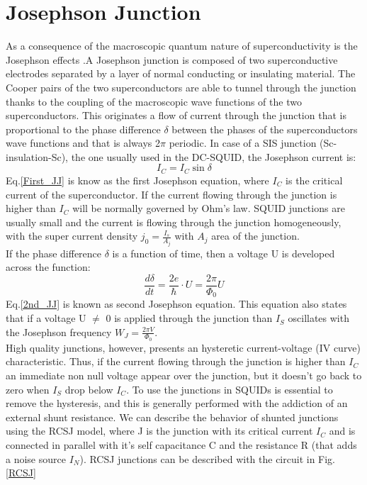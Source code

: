 \documentclass[12pt,a4paper]{report}
\begin{document}
    \section{Josephson Junction}
    As a consequence of the macroscopic quantum nature of superconductivity is the Josephson effects \cite{Squid_handbook_1}.A Josephson junction is composed of two superconductive electrodes separated by a layer of normal conducting or insulating material. The Cooper pairs of the two superconductors are able to tunnel through the junction thanks to the coupling of the macroscopic wave functions of the two superconductors. This originates a flow of current through the junction that is proportional to the phase difference $\delta$ between the phases of the superconductors wave functions and that is always 2$\pi$ periodic. In case of a SIS junction (Sc-insulation-Sc), the one usually used in the DC-SQUID, the Josephson current is:
    \begin{equation}
    	I_C= I_C\sin\delta
    	\label{First_JJ}
    \end{equation}
    Eq.\ref{First_JJ} is know as the first Josephson equation, where $I_C$ is the critical current of the superconductor. If the current flowing through the junction is higher than $I_C$ will be normally governed by Ohm's law. SQUID junctions are usually small and the current is flowing through the junction homogeneously, with the super current density $j_0= \frac{I_s}{A_j}$ with $A_j$ area of the junction.\\
    If the phase difference $\delta$ is a function of time, then a voltage U is developed across the function:
    \begin{equation}
    	\frac{d\delta}{dt}= \frac{2e}{\hbar}\cdot U = \frac{2\pi}{\Phi_0} U
    	\label{2nd_JJ}
    \end{equation}
    Eq.\ref{2nd_JJ} is known as second Josephson equation. This equation also states that if a voltage U $\neq$ 0 is applied through the junction than $I_S$ oscillates with the Josephson frequency $W_J = \frac{2\pi V}{\Phi_0}$.\\
    High quality junctions, however, presents an hysteretic current-voltage (IV curve) characteristic. Thus, if the current flowing through the junction is higher than $I_C$ an immediate non null voltage appear over the junction, but it doesn't go back to zero when $I_S$ drop below $I_C$. To use the junctions in SQUIDs is essential to remove the hysteresis, and this is generally performed with the addiction of an external shunt resistance. We can describe the behavior of shunted junctions using the RCSJ model, where J is the junction with its critical current $I_C$ and is connected in parallel with it's self capacitance C and the resistance R (that adds a noise source $I_N$). RCSJ junctions can be described with the circuit in Fig.\ref{RCSJ}
\end{document}
